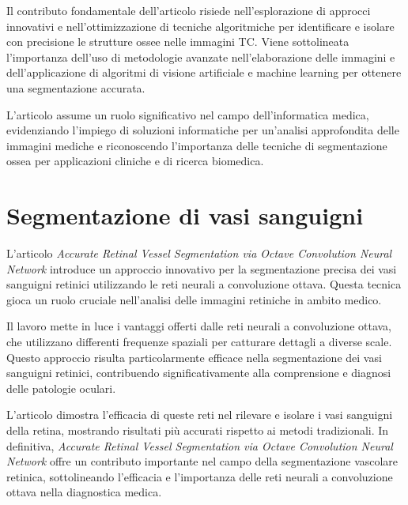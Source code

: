 Il contributo fondamentale dell'articolo risiede nell'esplorazione di approcci innovativi e
nell'ottimizzazione di tecniche algoritmiche per identificare e isolare con precisione le strutture
ossee nelle immagini TC. Viene sottolineata l'importanza dell'uso di metodologie avanzate
nell'elaborazione delle immagini e dell'applicazione di algoritmi di visione artificiale e machine
learning per ottenere una segmentazione accurata.

L'articolo assume un ruolo significativo nel campo dell'informatica medica, evidenziando l'impiego
di soluzioni informatiche per un'analisi approfondita delle immagini mediche e riconoscendo
l'importanza delle tecniche di segmentazione ossea per applicazioni cliniche e di ricerca biomedica.


\section{Segmentazione di vasi sanguigni} \label{sec:segmentazione_vasi_sanguigni}

L'articolo \textit{Accurate Retinal Vessel Segmentation via Octave Convolution Neural Network}
\cite{fan2020accurate} introduce un approccio innovativo per la segmentazione precisa dei vasi
sanguigni retinici utilizzando le reti neurali a convoluzione ottava. Questa tecnica gioca un ruolo
cruciale nell'analisi delle immagini retiniche in ambito medico.

Il lavoro mette in luce i vantaggi offerti dalle reti neurali a convoluzione ottava, che utilizzano
differenti frequenze spaziali per catturare dettagli a diverse scale. Questo approccio risulta
particolarmente efficace nella segmentazione dei vasi sanguigni retinici, contribuendo
significativamente alla comprensione e diagnosi delle patologie oculari.

L'articolo dimostra l'efficacia di queste reti nel rilevare e isolare i vasi sanguigni della retina,
mostrando risultati più accurati rispetto ai metodi tradizionali. In definitiva, \textit{Accurate
	Retinal Vessel Segmentation via Octave Convolution Neural Network} offre un contributo importante
nel campo della segmentazione vascolare retinica, sottolineando l'efficacia e l'importanza delle
reti neurali a convoluzione ottava nella diagnostica medica.
